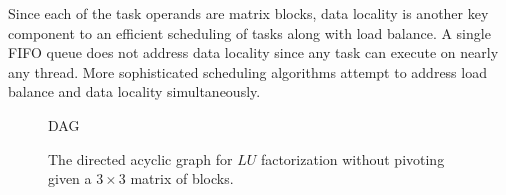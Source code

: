 Since each of the task operands are matrix blocks, data locality is
another key component to an efficient scheduling of tasks along with
load balance.
A single FIFO queue does not address data locality since any task can
execute on nearly any thread.
More sophisticated scheduling algorithms attempt to address load
balance and data locality simultaneously.

\begin{figure}
\begin{center}
DAG
\end{center}
\caption{The directed acyclic graph for $LU$ factorization without
  pivoting given a $3 \times 3$ matrix of blocks.}
\label{fig:dag}
\end{figure}
